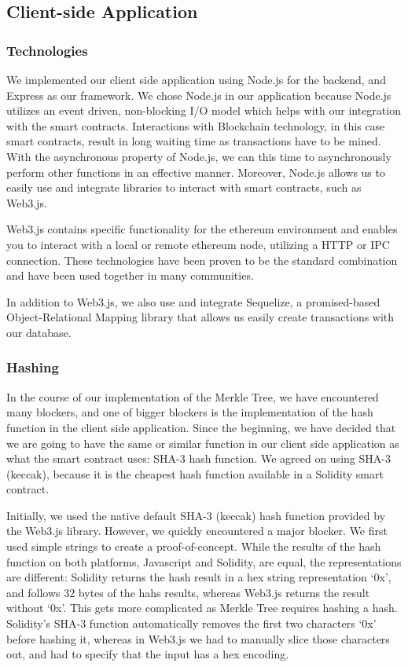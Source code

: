 \subsection{Client-side Application}
\label{subsec:approach-implementation-client}

\subsubsection*{Technologies}

We implemented our client side application using Node.js for the backend, and Express as our framework. We chose Node.js in our application because Node.js utilizes an event driven, non-blocking I/O model which helps with our integration with the smart contracts. Interactions with Blockchain technology, in this case smart contracts, result in long waiting time as transactions have to be mined. With the asynchronous property of Node.js, we can this time to asynchronously perform other functions in an effective manner. Moreover, Node.js allows us to easily use and integrate libraries to interact with smart contracts, such as Web3.js.

Web3.js contains specific functionality for the ethereum environment and enables you to interact with a local or remote ethereum node, utilizing a HTTP or IPC connection. These technologies have been proven to be the standard combination and have been used together in many communities.

In addition to Web3.js, we also use and integrate Sequelize, a promised-based Object-Relational Mapping library that allows us easily create transactions with our database.

\subsubsection*{Hashing}

In the course of our implementation of the Merkle Tree, we have encountered many blockers, and one of bigger blockers is the implementation of the hash function in the client side application. Since the beginning, we have decided that we are going to have the same or similar function in our client side application as what the smart contract uses: SHA-3 hash function. We agreed on using SHA-3 (keccak), because it is the cheapest hash function available in a Solidity smart contract.

Initially, we used the native default SHA-3 (keccak) hash function provided by the Web3.js library. However, we quickly encountered a major blocker. We first used simple strings to create a proof-of-concept. While the results of the hash function on both platforms, Javascript and Solidity, are equal, the representations are different: Solidity returns the hash result in a hex string representation ‘0x’, and follows 32 bytes of the hahs results, whereas Web3.js returns the result without ‘0x’. This gets more complicated as Merkle Tree requires hashing a hash. Solidity’s SHA-3 function automatically removes the first two characters ‘0x’ before hashing it, whereas in Web3.js we had to manually slice those characters out, and had to specify that the input has a hex encoding.

